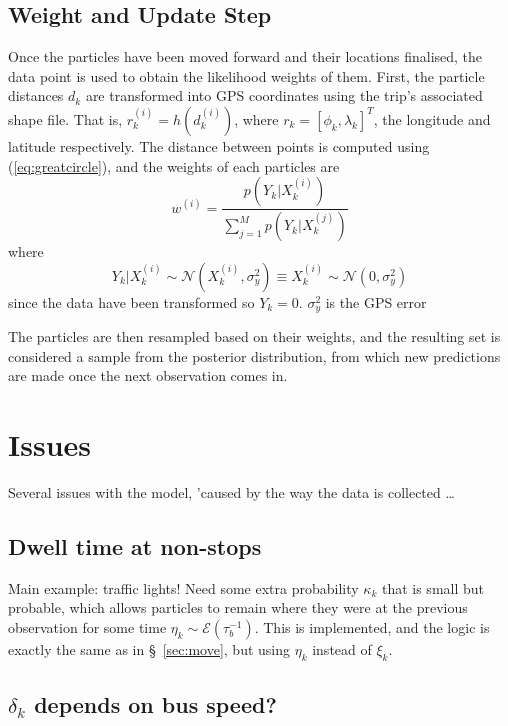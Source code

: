 \documentclass[10pt,a4paper]{article}
\begin{document}
\subsection{Weight and Update Step}

Once the particles have been moved forward and their locations finalised, the data point is used to 
obtain the likelihood weights of them.
First, the particle distances $d_k$ are transformed into GPS coordinates using the trip's associated 
shape file. 
That is, $r_k^{(i)} = h(d_k^{(i)})$, where $r_k = [\phi_k, \lambda_k]^T$, the longitude and latitude
respectively.
The distance between points is computed using (\ref{eq:greatcircle}), 
and the weights of each particles are
\begin{equation}
  \label{eq:particle_weights}
  w^{(i)} = \frac{p(Y_k | X_k^{(i)})}{\sum_{j=1}^M p(Y_k | X_k^{(j)})}
\end{equation}
where
\begin{equation}
  \label{eq:particle_lhood}
  Y_k | X_k^{(i)} \sim \mathcal{N}\left(X_k^{(i)}, \sigma_y^2\right) \equiv
  X_k^{(i)} \sim \mathcal{N}\left(0, \sigma_y^2\right)
\end{equation}
since the data have been transformed so $Y_k = 0$.
$\sigma_y^2$ is the GPS error

The particles are then resampled based on their weights, and the resulting set is considered
a sample from the posterior distribution, from which new predictions are made once the next 
observation comes in.



\section{Issues}

Several issues with the model, 'caused by the way the data is collected \ldots


\subsection{Dwell time at non-stops}

Main example: traffic lights! 
Need some extra probability $\kappa_k$ that is small but probable, 
which allows particles to remain where they were at the previous observation
for some time $\eta_k \sim \mathcal{E}(\tau_b^{-1})$.
This is implemented, and the logic is exactly the same as in \S~\ref{sec:move},
but using $\eta_k$ instead of $\xi_k$.


\subsection{$\delta_k$ depends on bus speed?}
\end{document}
